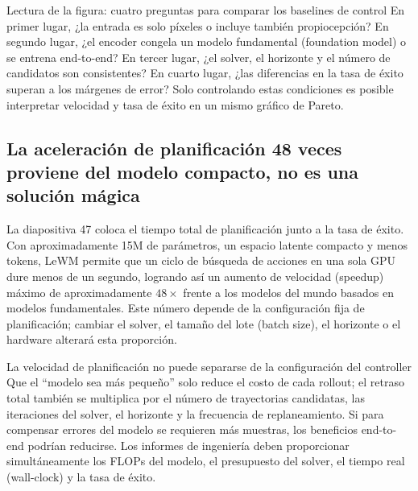 \begin{knowledgebox}{Lectura de la figura: cuatro preguntas para comparar los baselines de control}
En primer lugar, ¿la entrada es solo píxeles o incluye también propiocepción? En segundo lugar, ¿el encoder congela un modelo fundamental (foundation model) o se entrena end-to-end? En tercer lugar, ¿el solver, el horizonte y el número de candidatos son consistentes? En cuarto lugar, ¿las diferencias en la tasa de éxito superan a los márgenes de error? Solo controlando estas condiciones es posible interpretar velocidad y tasa de éxito en un mismo gráfico de Pareto.
\end{knowledgebox}

\subsection{La aceleración de planificación 48 veces proviene del modelo compacto, no es una solución mágica}

La diapositiva 47 coloca el tiempo total de planificación junto a la tasa de éxito. Con aproximadamente 15M de parámetros, un espacio latente compacto y menos tokens, LeWM permite que un ciclo de búsqueda de acciones en una sola GPU dure menos de un segundo, logrando así un aumento de velocidad (speedup) máximo de aproximadamente $48\times$ frente a los modelos del mundo basados en modelos fundamentales. Este número depende de la configuración fija de planificación; cambiar el solver, el tamaño del lote (batch size), el horizonte o el hardware alterará esta proporción.



\begin{warningbox}{La velocidad de planificación no puede separarse de la configuración del controller}
Que el ``modelo sea más pequeño'' solo reduce el costo de cada rollout; el retraso total también se multiplica por el número de trayectorias candidatas, las iteraciones del solver, el horizonte y la frecuencia de replaneamiento. Si para compensar errores del modelo se requieren más muestras, los beneficios end-to-end podrían reducirse. Los informes de ingeniería deben proporcionar simultáneamente los FLOPs del modelo, el presupuesto del solver, el tiempo real (wall-clock) y la tasa de éxito.
\end{warningbox}

